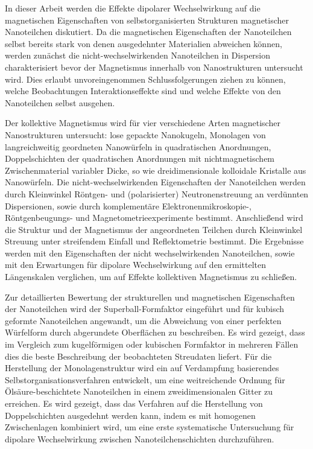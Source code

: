 \documentclass[\main/dresen_thesis.tex]{subfiles}
\begin{document}
  In dieser Arbeit werden die Effekte dipolarer Wechselwirkung auf die magnetischen Eigenschaften von selbstorganisierten Strukturen magnetischer Nanoteilchen diskutiert.
  Da die magnetischen Eigenschaften der Nanoteilchen selbst bereits stark von denen ausgedehnter Materialien abweichen können, werden zunächst die nicht-wechselwirkenden Nanoteilchen in Dispersion charakterisiert bevor der Magnetismus innerhalb von Nanostrukturen untersucht wird.
  Dies erlaubt unvoreingenommen Schlussfolgerungen ziehen zu können, welche Beobachtungen Interaktionseffekte sind und welche Effekte von den Nanoteilchen selbst ausgehen.

  Der kollektive Magnetismus wird für vier verschiedene Arten magnetischer Nanostrukturen untersucht: lose gepackte Nanokugeln, Monolagen von langreichweitig geordneten Nanowürfeln in quadratischen Anordnungen, Doppelschichten der quadratischen Anordnungen mit nichtmagnetischem Zwischenmaterial variabler Dicke, so wie dreidimensionale kolloidale Kristalle aus Nanowürfeln.
  Die nicht-wechselwirkenden Eigenschaften der Nanoteilchen werden durch Kleinwinkel Röntgen- und (polarisierter) Neutronenstreuung an verdünnten Dispersionen, sowie durch komplementäre Elektronenmikroskopie-, Röntgenbeugungs- und Magnetometrieexperimente bestimmt.
  Anschließend wird die Struktur und der Magnetismus der angeordneten Teilchen durch Kleinwinkel Streuung unter streifendem Einfall und Reflektometrie bestimmt.
  Die Ergebnisse werden mit den Eigenschaften der nicht wechselwirkenden Nanoteilchen, sowie mit den Erwartungen für dipolare Wechselwirkung auf den ermittelten Längenskalen verglichen, um auf Effekte kollektiven Magnetismus zu schließen.

  Zur detaillierten Bewertung der strukturellen und magnetischen Eigenschaften der Nanoteilchen wird der Superball-Formfaktor eingeführt und für kubisch geformte Nanoteilchen angewandt, um die Abweichung von einer perfekten Würfelform durch abgerundete Oberflächen zu beschreiben.
  Es wird gezeigt, dass im Vergleich zum kugelförmigen oder kubischen Formfaktor in mehreren Fällen dies die beste Beschreibung der beobachteten Streudaten liefert.
  Für die Herstellung der Monolagenstruktur wird ein auf Verdampfung basierendes Selbstorganisationsverfahren entwickelt, um eine weitreichende Ordnung für Ölsäure-beschichtete Nanoteilchen in einem zweidimensionalen Gitter zu erreichen.
  Es wird gezeigt, dass das Verfahren auf die Herstellung von Doppelschichten ausgedehnt werden kann, indem es mit homogenen Zwischenlagen kombiniert wird, um eine erste systematische Untersuchung für dipolare Wechselwirkung zwischen Nanoteilchenschichten durchzuführen.
\end{document}
